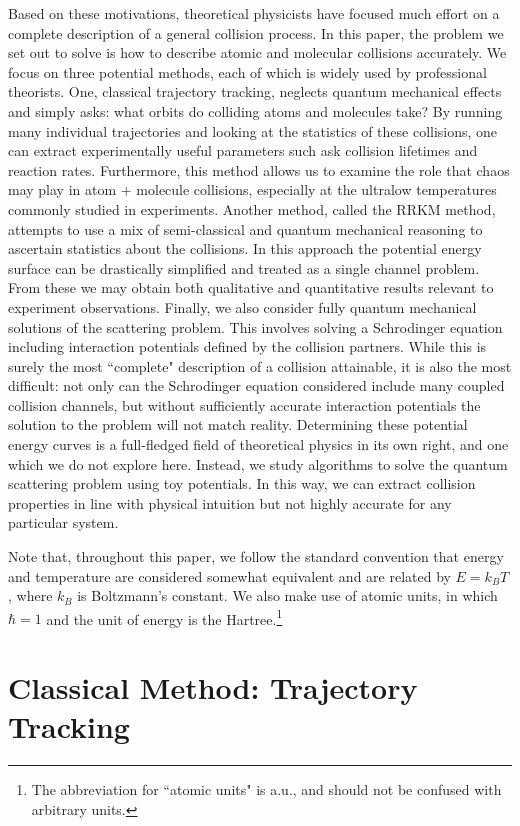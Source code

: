 \documentclass[%
 reprint,
 amsmath,amssymb,
 aps,
 nofootinbib
]{revtex4-1}
\begin{document}
Based on these motivations, theoretical physicists have focused much effort on a complete description of a general collision process. In this paper, the problem we set out to solve is how to describe atomic and molecular collisions accurately. We focus on three potential methods, each of which is widely used by professional theorists. One, classical trajectory tracking, neglects quantum mechanical effects and simply asks: what orbits do colliding atoms and molecules take? By running many individual trajectories and looking at the statistics of these collisions, one can extract experimentally useful parameters such ask collision lifetimes and reaction rates. Furthermore, this method allows us to examine the role that chaos may play in atom + molecule collisions, especially at the ultralow temperatures commonly studied in experiments. Another method, called the RRKM method, attempts to use a mix of semi-classical and quantum mechanical reasoning to ascertain statistics about the collisions. In this approach the potential energy surface can be drastically simplified and treated as a single channel problem. From these we may obtain both qualitative and quantitative results relevant to experiment observations. Finally, we also consider fully quantum mechanical solutions of the scattering problem. This involves solving a Schrodinger equation including interaction potentials defined by the collision partners. While this is surely the most ``complete" description of a collision attainable, it is also the most difficult: not only can the Schrodinger equation considered include many coupled collision channels, but without sufficiently accurate interaction potentials the solution to the problem will not match reality. Determining these potential energy curves is a full-fledged field of theoretical physics in its own right, and one which we do not explore here. Instead, we study algorithms to solve the quantum scattering problem using toy potentials. In this way, we can extract collision properties in line with physical intuition but not highly accurate for any particular system. 

Note that, throughout this paper, we follow the standard convention that energy and temperature are considered somewhat equivalent and are related by $E = k_B T$, where $k_B$ is Boltzmann's constant. We also make use of atomic units, in which $\hbar = 1$ and the unit of energy is the Hartree.\footnote{The abbreviation for ``atomic units" is a.u., and should not be confused with arbitrary units.}


\section{\label{sec:ClassicalTraj} Classical Method: Trajectory Tracking}
\end{document}
